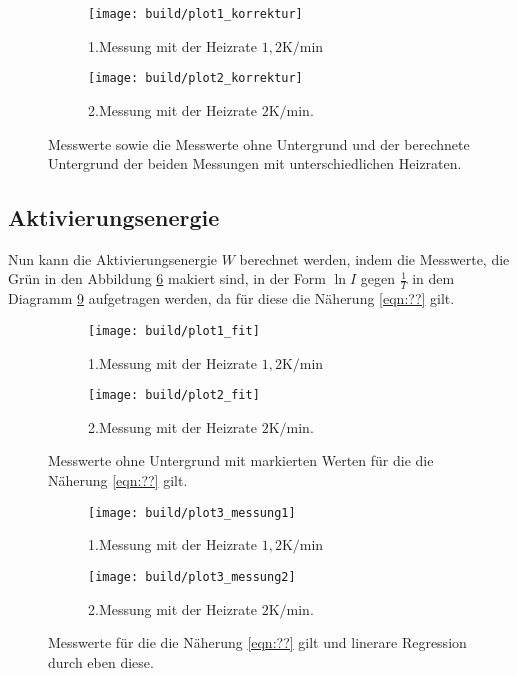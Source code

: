 \begin{figure}
  \centering
  \begin{subfigure}{0.48\textwidth}
    \centering
    \texttt{[image: build/plot1\_korrektur]}
    \caption{1.Messung mit der Heizrate $1,2 \si{\kelvin\per\minute}$}
    \label{fig:korr1}
  \end{subfigure}
  \begin{subfigure}{0.48\textwidth}
    \centering
    \texttt{[image: build/plot2\_korrektur]}
    \caption{2.Messung mit der Heizrate $2 \si{\kelvin\per\minute}$.}
    \label{fig:korr2}
  \end{subfigure}
\caption{Messwerte sowie die Messwerte ohne Untergrund  und der berechnete Untergrund der beiden Messungen mit unterschiedlichen Heizraten.}
\label{fig:korr}
\end{figure}

\subsection{Aktivierungsenergie}
\label{sec:Aktivierungsenergie}
Nun kann die Aktivierungsenergie $W$ berechnet werden, indem die Messwerte,
die Grün in den Abbildung \ref{fig:fit} makiert sind, in der Form
$\ln I$ gegen $\frac{1}{T}$ in dem Diagramm
\ref{fig:logfit} aufgetragen werden, da für diese die Näherung
\ref{eqn:??} gilt.


\begin{figure}
  \centering
  \begin{subfigure}{0.48\textwidth}
    \centering
    \texttt{[image: build/plot1\_fit]}
    \caption{1.Messung mit der Heizrate $1,2 \si{\kelvin\per\minute}$}
    \label{fig:fit1}
  \end{subfigure}
  \begin{subfigure}{0.48\textwidth}
    \centering
    \texttt{[image: build/plot2\_fit]}
    \caption{2.Messung mit der Heizrate $2 \si{\kelvin\per\minute}$.}
    \label{fig:fit2}
  \end{subfigure}
\caption{Messwerte ohne Untergrund mit markierten Werten für die
die Näherung \ref{eqn:??} gilt.}
\label{fig:fit}
\end{figure}





\begin{figure}
  \centering
  \begin{subfigure}{0.48\textwidth}
    \centering
    \texttt{[image: build/plot3\_messung1]}
    \caption{1.Messung mit der Heizrate $1,2 \si{\kelvin\per\minute}$}
    \label{fig:logfit1}
  \end{subfigure}
  \begin{subfigure}{0.48\textwidth}
    \centering
    \texttt{[image: build/plot3\_messung2]}
    \caption{2.Messung mit der Heizrate $2 \si{\kelvin\per\minute}$.}
    \label{fig:logfit2}
  \end{subfigure}
\caption{Messwerte für die
die Näherung \ref{eqn:??} gilt und linerare Regression durch eben diese.}
\label{fig:logfit}
\end{figure}


